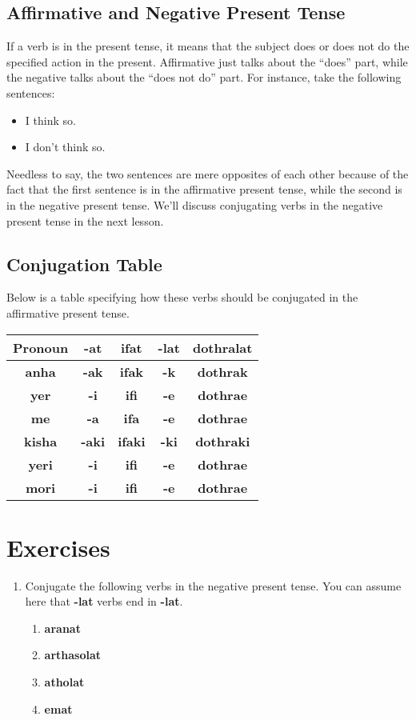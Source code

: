\subsection*{Affirmative and Negative Present Tense}
If a verb is in the present tense, it means that the subject does or does not do the specified action in the present.
Affirmative just talks about the ``does'' part, while the negative talks about the ``does not do'' part. For instance,
take the following sentences:
\begin{itemize}
	\item I think so.
	\item I don't think so.
\end{itemize}
Needless to say, the two sentences are mere opposites of each other because of the fact that the first sentence is in
the affirmative present tense, while the second is in the negative present tense. We'll discuss conjugating verbs in the negative present
tense in the next lesson.
\subsection*{Conjugation Table}
Below is a table specifying how these verbs should be conjugated in the affirmative present tense. \\
\begin{tabular}{|c|c|c|c|c|}
		\hline
		Pronoun & \textbf{-at} & \textbf{ifat} & \textbf{-lat} & \textbf{dothralat} \\
		\hline
		\textbf{anha} & \textbf{-ak} & \textbf{ifak} & \textbf{-k} & \textbf{dothrak} \\
		\hline
		\textbf{yer} & \textbf{-i} & \textbf{ifi} & \textbf{-e} & \textbf{dothrae} \\
		\hline
		\textbf{me} & \textbf{-a} & \textbf{ifa} & \textbf{-e} & \textbf{dothrae} \\
		\hline
		\textbf{kisha} & \textbf{-aki} & \textbf{ifaki} & \textbf{-ki} & \textbf{dothraki} \\
		\hline
		\textbf{yeri} & \textbf{-i} & \textbf{ifi} & \textbf{-e} & \textbf{dothrae} \\
		\hline
		\textbf{mori} & \textbf{-i} & \textbf{ifi} & \textbf{-e} & \textbf{dothrae} \\
		\hline
\end{tabular}
\section*{Exercises}
\begin{enumerate}
	\item Conjugate the following verbs in the negative present tense. You can assume here that
\textbf{-lat} verbs end in \textbf{-lat}.
	\begin{enumerate}
		\item \textbf{aranat}
		\item \textbf{arthasolat}
		\item \textbf{atholat}
		\item \textbf{emat}
	\end{enumerate}
\end{enumerate}
